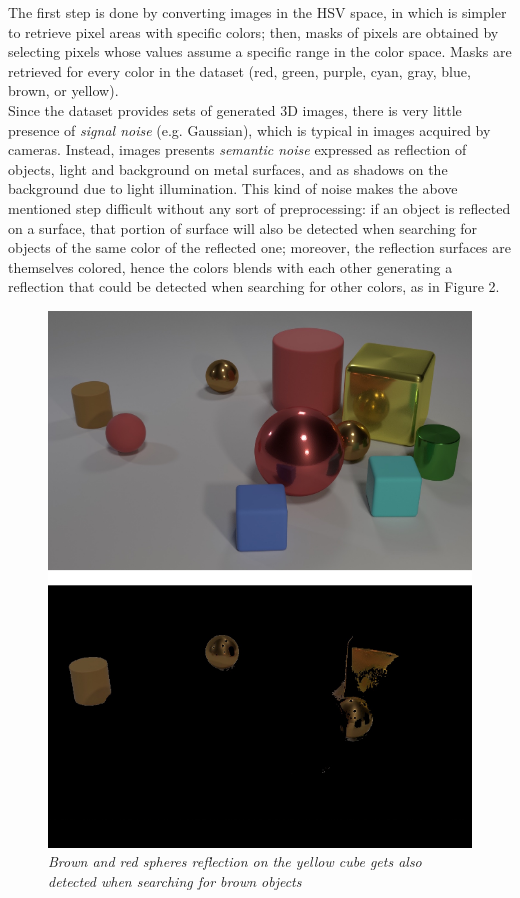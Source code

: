 \documentclass[10pt,twocolumn,letterpaper]{article}
\begin{document}
  The first step is done by converting images in the HSV space,
   in which is simpler to retrieve pixel areas with
  specific colors; then, masks of pixels are obtained by selecting 
  pixels whose values assume a specific range in the color space.
  Masks are retrieved for every color in the dataset
   (red, green, purple, cyan, gray, blue, brown, or yellow).
  \\Since the dataset provides sets of generated 3D images, there is very little presence 
  of \textit{signal noise} (e.g. Gaussian), which is typical in images acquired by cameras. 
  Instead, images presents \textit{semantic noise} expressed as reflection of objects,
  light and background on metal surfaces, and as shadows on the background
  due to light illumination. This kind of noise makes the above mentioned step difficult
  without any sort of preprocessing:
  if an object is reflected on a surface, that portion of surface will also be
  detected when searching for objects of the same color of the reflected one; moreover,
  the reflection surfaces are themselves colored, hence the colors blends with each other
  generating a reflection that could be detected when searching for other colors, 
  as in Figure 2.
  \begin{figure}[h] %
    \centering
    \includegraphics[scale=0.5]{images/noise_wrong.png}
    \caption{\textit{Brown and red spheres reflection on the
     yellow cube gets also detected when searching for brown objects}}
  \end{figure}
\end{document}
